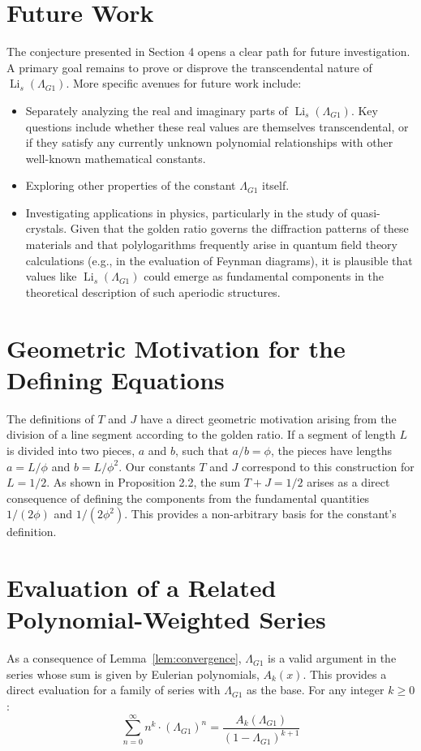 \documentclass{amsart}
\theoremstyle{plain}
\theoremstyle{definition}
\theoremstyle{remark}
\DeclareMathOperator{\Li}{Li} %
\newcommand{\LambdaG}{\Lambda_{G1}}
\newcommand{\phiG}{\phi}
\begin{document}
\section{Future Work}
The conjecture presented in Section 4 opens a clear path for future investigation. A primary goal remains to prove or disprove the transcendental nature of $\Li_s(\LambdaG)$. More specific avenues for future work include:
\begin{itemize}
    \item Separately analyzing the real and imaginary parts of $\Li_s(\LambdaG)$. Key questions include whether these real values are themselves transcendental, or if they satisfy any currently unknown polynomial relationships with other well-known mathematical constants.
    \item Exploring other properties of the constant $\LambdaG$ itself.
    \item Investigating applications in physics, particularly in the study of quasi-crystals. Given that the golden ratio governs the diffraction patterns of these materials and that polylogarithms frequently arise in quantum field theory calculations (e.g., in the evaluation of Feynman diagrams), it is plausible that values like $\Li_s(\LambdaG)$ could emerge as fundamental components in the theoretical description of such aperiodic structures.
\end{itemize}

\appendix
\section{Geometric Motivation for the Defining Equations}
The definitions of $T$ and $J$ have a direct geometric motivation arising from the division of a line segment according to the golden ratio. If a segment of length $L$ is divided into two pieces, $a$ and $b$, such that $a/b = \phiG$, the pieces have lengths $a=L/\phiG$ and $b=L/\phiG^2$. Our constants $T$ and $J$ correspond to this construction for $L=1/2$. As shown in Proposition 2.2, the sum $T+J=1/2$ arises as a direct consequence of defining the components from the fundamental quantities $1/(2\phiG)$ and $1/(2\phiG^2)$. This provides a non-arbitrary basis for the constant's definition.

\section{Evaluation of a Related Polynomial-Weighted Series}
As a consequence of Lemma~\ref{lem:convergence}, $\LambdaG$ is a valid argument in the series whose sum is given by Eulerian polynomials, $A_k(x)$. This provides a direct evaluation for a family of series with $\LambdaG$ as the base. For any integer $k \ge 0$:
$$ \sum_{n=0}^{\infty} n^k \cdot (\LambdaG)^n = \frac{A_k(\LambdaG)}{(1-\LambdaG)^{k+1}} $$
\end{document}
